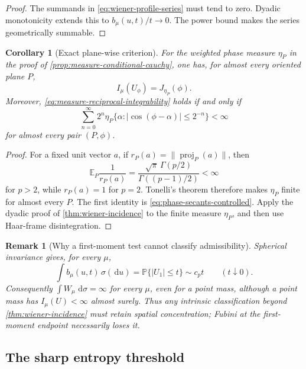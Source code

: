 \documentclass[11pt]{article}
\numberwithin{equation}{section}
\theoremstyle{thmstyleone}%
\newtheorem{corollary}[corollary]{Corollary}
\theoremstyle{thmstyletwo}%
\newtheorem*{remark}{Remark}%
\let\cref\autoref
\newcommand{\E}{\mathbb E}
\newcommand{\Prb}{\mathbb P}
\newcommand{\dd}{\,\mathrm d}
\begin{document}
\begin{proof}
The summands in \cref{eq:wiener-profile-series} must tend to zero.  Dyadic
monotonicity extends this to \(b_\mu(u,t)/t\to0\).  The power bound makes
the series geometrically summable.
\end{proof}

\begin{corollary}[Exact plane-wise criterion]
\label{cor:plane-wise-wiener}
For the weighted phase measure \(\eta_P\) in the proof of
\cref{prop:measure-conditional-cauchy}, one has, for almost every oriented
plane \(P\),
\[
  I_\mu(U_\phi)=J_{\eta_P}(\phi).
\]
Moreover,
\cref{eq:measure-reciprocal-integrability} holds if and only if
\begin{equation}
  \sum_{n=0}^\infty 2^n
  \eta_P\{\alpha:|\cos(\phi-\alpha)|\leq2^{-n}\}
  <\infty
  \label{eq:plane-wise-wiener}
\end{equation}
for almost every pair \((P,\phi)\).
\end{corollary}

\begin{proof}
For a fixed unit vector \(a\), if
\(r_P(a)=\|\operatorname{proj}_P(a)\|\), then
\[
  \E_P\frac1{r_P(a)}
  =
  \frac{\sqrt\pi\,\Gamma(p/2)}{\Gamma((p-1)/2)}
  <\infty
\]
for \(p>2\), while \(r_P(a)=1\) for \(p=2\).  Tonelli's theorem therefore
makes \(\eta_P\) finite for almost every \(P\).  The first identity is
\cref{eq:phase-secants-controlled}.  Apply the dyadic proof of
\cref{thm:wiener-incidence} to the finite measure \(\eta_P\), and then use
Haar-frame disintegration.
\end{proof}

\begin{remark}[Why a first-moment test cannot classify admissibility]
\label{rem:wiener-fubini-obstruction}
Spherical invariance gives, for every \(\mu\),
\[
  \int b_\mu(u,t)\,\sigma(\dd u)
  =
  \Prb\{|U_1|\leq t\}\sim c_p t
  \qquad(t\downarrow0).
\]
Consequently \(\int W_\mu\,\dd\sigma=\infty\) for every \(\mu\), even for
a point mass, although a point mass has \(I_\mu(U)<\infty\) almost surely.
Thus any intrinsic classification beyond
\cref{thm:wiener-incidence} must retain spatial concentration; Fubini at
the first-moment endpoint necessarily loses it.
\end{remark}

\subsection{The sharp entropy threshold}
\end{document}
